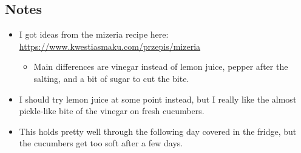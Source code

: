 \begin{multicols}{2}
\begin{enumerate}
\end{enumerate}

\subsection*{Notes}
\begin{itemize}
    \item I got ideas from the mizeria recipe here: \url{https://www.kwestiasmaku.com/przepis/mizeria}
    \begin{itemize}
        \item Main differences are vinegar instead of lemon juice, pepper after the salting, and a bit of sugar to cut the bite.
    \end{itemize}
    \item I should try lemon juice at some point instead, but I really like the almost pickle-like bite of the vinegar on fresh cucumbers.
    \item This holds pretty well through the following day covered in the fridge, but the cucumbers get too soft after a few days.
\end{itemize}
\end{multicols}
\clearpage